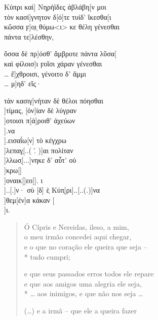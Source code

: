 \begin{gkverse}
Κύπρι καὶ] Νηρήϊδες ἀβλάβη[ν μοι\\
		τὸν κασί]γνητον δ[ό]τε τυίδ’ ἴκεσθα[ι\\
κὤσσα ϝ]ο̣ι ̣θύμω<ι> κε θέλη γένεσθαι\\
πάντα τε]λέσθην,

ὄσσα δὲ πρ]όσθ’ ἄμβροτε πάντα λῦσα[\\
καὶ φίλοισ]ι ϝοῖσι χάραν γένεσθαι\\
\ldots{} ἔ]χθροισι, γένοιτο δ’ ἄμμι\\
\ldots{} μ]ηδ’ εἴς·

τὰν κασιγ]νήταν δὲ θέλοι πόησθαι\\
 ]τίμας, [ὀν]ίαν δὲ λύγραν\\
 ]οτοισι π[ά]ροιθ’ ἀχεύων\\
 ].να\\
 ].εισαΐω[ν] τὸ κέγχρω\\
  ]λεπαγ̣[..( .́ )]αι πολίταν\\
  ]λλωσ̣[...]νηκε δ’ αὖτ’ οὐ\\
 ]κρω[]\\
 ]οναικ[\quad]εο[\quad]. ι\\
 ]..[.]ν· σὺ [δ] ὲ̣ Κύπ̣[ρι]..[..(.)]να\\
       ]θεμ[έν]α κάκαν [\\
	       ]ι.	
\end{gkverse}

\begin{verse}
Ó Cípris e Nereidas, ileso, a mim,\\
o meu irmão concedei aqui chegar,\\
e o que no coração ele queira que seja --\\*
tudo cumpri;

e que seus passados erros todos ele repare\\
e que aos amigos uma alegria ele seja,\\*
\ldots{} aos inimigos, e que não nos seja \ldots{}

(\ldots{}) e a irmã -- que ele a queira fazer
\end{verse}

